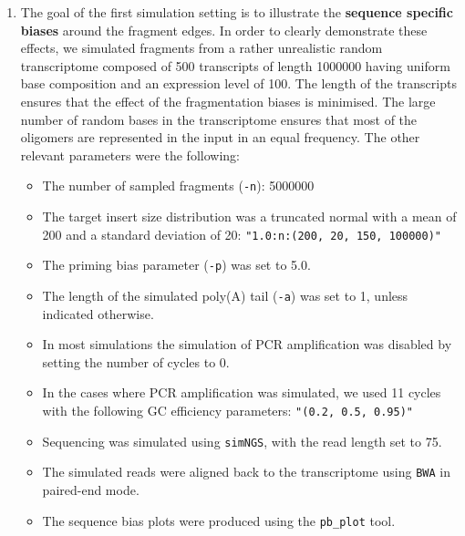 \begin{enumerate}
        \item{The goal of the first simulation setting is to illustrate the \textbf{sequence specific biases} around the fragment edges. In order to clearly demonstrate these effects, we simulated fragments from a rather unrealistic random transcriptome composed of 500 transcripts of length 1000000 having uniform base composition and an expression level of 100. The length of the transcripts ensures that the effect of the fragmentation biases is minimised. The large number of random bases in the transcriptome ensures that most of the oligomers are represented in the input in an equal frequency. The other relevant parameters were the following:
        \begin{itemize}
            \item{The number of sampled fragments (\texttt{-n}): 5000000}
            \item{The target insert size distribution was a truncated normal with a mean of 200 and a standard deviation of 20: \texttt{"1.0:n:(200, 20, 150, 100000)"}}
            \item{The priming bias parameter (\texttt{-p}) was set to 5.0.} 
            \item{The length of the simulated poly(A) tail (\texttt{-a}) was set to 1, unless indicated otherwise.}
            \item{In most simulations the simulation of PCR amplification was disabled by setting the number of cycles to 0.}
            \item{In the cases where PCR amplification was simulated, we used 11 cycles with the following GC efficiency parameters: \texttt{"(0.2, 0.5, 0.95)"}}
            \item{Sequencing was simulated using \texttt{simNGS}, with the read length set to 75.}
            \item{The simulated reads were aligned back to the transcriptome using \texttt{BWA} in paired-end mode.}
            \item{The sequence bias plots were produced using the \texttt{pb\_plot} tool.}
        \end{itemize}

}
\end{enumerate}
